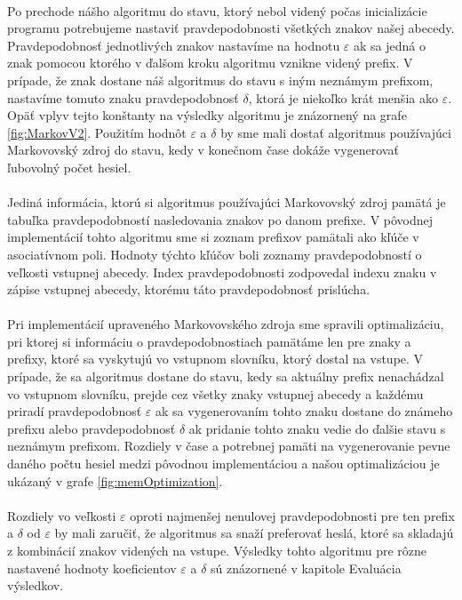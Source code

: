 \paragraph{}
Po prechode nášho algoritmu do stavu, ktorý nebol videný počas inicializácie programu potrebujeme nastaviť pravdepodobnosti všetkých znakov našej abecedy. Pravdepodobnosť jednotlivých znakov nastavíme na hodnotu \(\varepsilon\) ak sa jedná o znak pomocou ktorého v ďalšom kroku algoritmu vznikne videný prefix. V prípade, že znak dostane náš algoritmus do stavu s iným neznámym prefixom, nastavíme tomuto znaku pravdepodobnosť \(\delta\), ktorá je niekoľko krát menšia ako \(\varepsilon\). Opäť vplyv tejto konštanty na výsledky algoritmu je znázornený na grafe \ref{fig:MarkovV2}. Použitím hodnôt \(\varepsilon\) a \(\delta\) by sme mali dostať algoritmus používajúci Markovovský zdroj do stavu, kedy v konečnom čase dokáže vygenerovať ľubovolný počet hesiel.

\paragraph{}
Jediná informácia, ktorú si algoritmus používajúci Markovovský zdroj pamätá je tabuľka pravdepodobností nasledovania znakov po danom prefixe. V pôvodnej implementácií tohto algoritmu sme si zoznam prefixov pamätali ako kľúče v asociatívnom poli. Hodnoty týchto kľúčov boli zoznamy pravdepodobností o veľkosti vstupnej abecedy. Index pravdepodobnosti zodpovedal indexu znaku v zápise vstupnej abecedy, ktorému táto pravdepodobnosť prislúcha.

\paragraph{}
Pri implementácií upraveného Markovovského zdroja sme spravili optimalizáciu, pri ktorej si informáciu o pravdepodobnostiach pamätáme len pre znaky a prefixy, ktoré sa vyskytujú vo vstupnom slovníku, ktorý dostal na vstupe. V prípade, že sa algoritmus dostane do stavu, kedy sa aktuálny prefix nenachádzal vo vstupnom slovníku, prejde cez všetky znaky vstupnej abecedy a každému priradí pravdepodobnosť \(\varepsilon\) ak sa vygenerovaním tohto znaku dostane do známeho prefixu alebo pravdepodobnosť \(\delta\) ak pridanie tohto znaku vedie do ďalšie stavu s neznámym prefixom. Rozdiely v čase a potrebnej pamäti na vygenerovanie pevne daného počtu hesiel medzi pôvodnou implementáciou a našou optimalizáciou je ukázaný v grafe \ref{fig:memOptimization}.

\paragraph{}
Rozdiely vo veľkosti \(\varepsilon\) oproti najmenšej nenulovej pravdepodobnosti pre ten prefix a \(\delta\) od \(\varepsilon\) by mali zaručiť, že algoritmus sa snaží preferovať heslá, ktoré sa skladajú z kombinácií znakov videných na vstupe. Výsledky tohto algoritmu pre rôzne nastavené hodnoty koeficientov \(\varepsilon\) a \(\delta\) sú znázornené v kapitole Evaluácia výsledkov.

